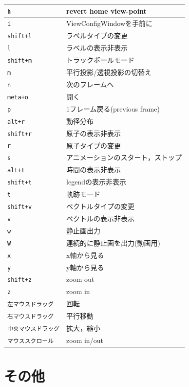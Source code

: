 \documentclass[a4j,openany]{jbook}
\begin{document}
\begin{longtable}{l|l}
     \verb|h|  & revert home view-point\\ \hline
     \verb|i|  & ViewConfigWindowを手前に\\ \hline
     \verb|shift+l|  & ラベルタイプの変更\\ \hline
     \verb|l|  & ラベルの表示非表示\\ \hline
     \verb|shift+m|  & トラックボールモード\\ \hline
     \verb|m|  & 平行投影/透視投影の切替え\\ \hline
     \verb|n|  & 次のフレームへ\\ \hline
     \verb|meta+o|  & 開く\\ \hline
     \verb|p|  & 1フレーム戻る(previous frame)   \\ \hline
     \verb|alt+r|  & 動径分布\\ \hline
     \verb|shift+r|  & 原子の表示非表示\\ \hline
     \verb|r|  & 原子タイプの変更\\ \hline
     \verb|s|  & アニメーションのスタート，ストップ\\ \hline
     \verb|alt+t|  & 時間の表示非表示\\ \hline
     \verb|shift+t|  & legendの表示非表示\\ \hline
     \verb|t|  & 軌跡モード\\ \hline
     \verb|shift+v|  & ベクトルタイプの変更\\ \hline
     \verb|v|  & ベクトルの表示非表示\\ \hline
     \verb|w|  & 静止画出力   \\ \hline
     \verb|W|  & 連続的に静止画を出力(動画用) \\ \hline
     \verb|x|  & x軸から見る   \\ \hline
     \verb|y|  & y軸から見る   \\ \hline
     \verb|shift+z|  & zoom out   \\ \hline
     \verb|z|  & zoom in   \\ \hline
     \verb|左マウスドラッグ|  & 回転 \\ \hline
     \verb|右マウスドラッグ|  & 平行移動 \\ \hline
     \verb|中央マウスドラッグ|  & 拡大，縮小   \\ \hline
     \verb|マウススクロール|  & zoom in/out   \\ \hline
  \end{longtable}



\chapter{その他}
\end{document}
